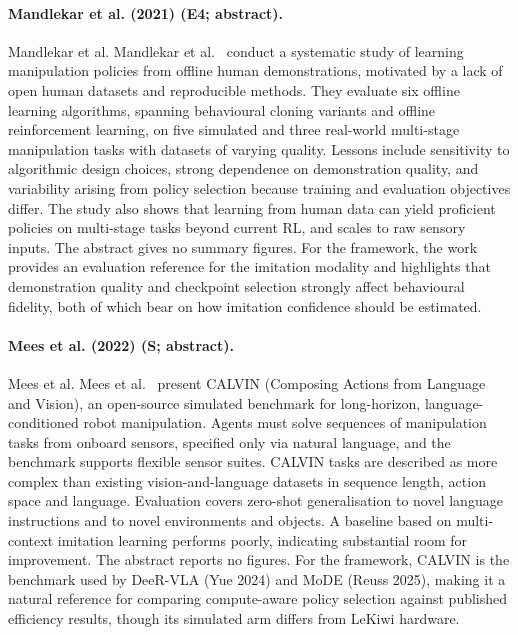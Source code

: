 \documentclass[10pt,a4paper]{article}
\begin{document}
\paragraph{Mandlekar et al. (2021) (E4; abstract).} Mandlekar et al. Mandlekar et al.~\cite{Mandlekar2021} conduct a systematic study of learning manipulation policies from offline human demonstrations, motivated by a lack of open human datasets and reproducible methods. They evaluate six offline learning algorithms, spanning behavioural cloning variants and offline reinforcement learning, on five simulated and three real-world multi-stage manipulation tasks with datasets of varying quality. Lessons include sensitivity to algorithmic design choices, strong dependence on demonstration quality, and variability arising from policy selection because training and evaluation objectives differ. The study also shows that learning from human data can yield proficient policies on multi-stage tasks beyond current RL, and scales to raw sensory inputs. The abstract gives no summary figures. For the framework, the work provides an evaluation reference for the imitation modality and highlights that demonstration quality and checkpoint selection strongly affect behavioural fidelity, both of which bear on how imitation confidence should be estimated.

\paragraph{Mees et al. (2022) (S; abstract).} Mees et al. Mees et al.~\cite{Mees2022} present CALVIN (Composing Actions from Language and Vision), an open-source simulated benchmark for long-horizon, language-conditioned robot manipulation. Agents must solve sequences of manipulation tasks from onboard sensors, specified only via natural language, and the benchmark supports flexible sensor suites. CALVIN tasks are described as more complex than existing vision-and-language datasets in sequence length, action space and language. Evaluation covers zero-shot generalisation to novel language instructions and to novel environments and objects. A baseline based on multi-context imitation learning performs poorly, indicating substantial room for improvement. The abstract reports no figures. For the framework, CALVIN is the benchmark used by DeeR-VLA (Yue 2024) and MoDE (Reuss 2025), making it a natural reference for comparing compute-aware policy selection against published efficiency results, though its simulated arm differs from LeKiwi hardware.
\end{document}
